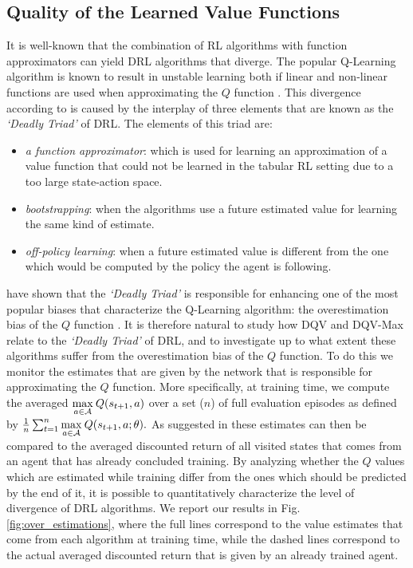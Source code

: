 

\subsection{Quality of the Learned Value Functions}
\label{sec:quality_of_value_functions}

It is well-known that the combination of RL algorithms with function approximators can yield DRL algorithms that diverge. The popular Q-Learning algorithm is known to result in unstable learning both if linear \cite{tsitsiklis1997analysis} and non-linear functions are used when approximating the $Q$ function \cite{van2018deep}. This divergence according to \citet{sutton2018reinforcement} is caused by the interplay of three elements that are known as the \textit{`Deadly Triad'} of DRL. The elements of this triad are:
\begin{itemize}
    \item \textit{a function approximator}: which is used for learning an approximation of a value function that could not be learned in the tabular RL setting due to a too large state-action space.
    \item \textit{bootstrapping}: when the algorithms use a future estimated value for learning the same kind of estimate.
    \item \textit{off-policy learning}: when a future estimated value is different from the one which would be computed by the policy the agent is following.
\end{itemize}{}

\citet{van2018deep} have shown that the \textit{`Deadly Triad'} is responsible for enhancing one of the most popular biases that characterize the Q-Learning algorithm: the overestimation bias of the $Q$ function \cite{hasselt2010double}. It is therefore natural to study how DQV and DQV-Max relate to the \textit{`Deadly Triad'} of DRL, and to investigate up to what extent these algorithms suffer from the overestimation bias of the $Q$ function. To do this we monitor the estimates that are given by the network that is responsible for approximating the $Q$ function. More specifically, at training time, we compute the averaged $\underset{a \in \cal A}{\max}\:Q(s_{t+1}, a)$ over a set ($n$) of full evaluation episodes as defined by $\frac{1}{n}\sum_{t=1}^{n}\underset{a \in \cal A}{\max}\:Q(s_{t+1}, a;\theta).$ As suggested in \cite{van2016deep} these estimates can then be compared to the averaged discounted return of all visited states that comes from an agent that has already concluded training. By analyzing whether the $Q$ values which are estimated while training differ from the ones which should be predicted by the end of it, it is possible to quantitatively characterize the level of divergence of DRL algorithms. We report our results in Fig. \ref{fig:over_estimations}, where the full lines correspond to the value estimates that come from each algorithm at training time, while the dashed lines correspond to the actual averaged discounted return that is given by an already trained agent.

